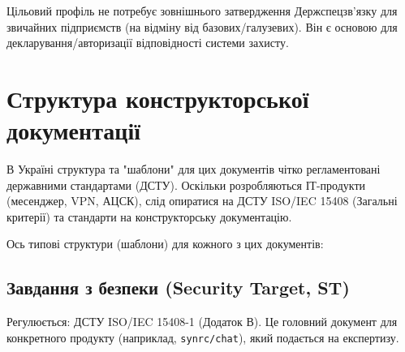 \documentclass{article}
\begin{document}
Цільовий профіль не потребує зовнішнього затвердження Держспецзв’язку для звичайних
підприємств (на відміну від базових/галузевих). Він є основою для декларування/авторизації відповідності системи захисту.

\section{Структура конструкторської документації}

В Україні структура та "шаблони" для цих документів чітко регламентовані державними
стандартами (ДСТУ). Оскільки розробляються ІТ-продукти (месенджер, VPN, АЦСК),
слід опиратися на ДСТУ ISO/IEC 15408 (Загальні критерії) та стандарти на конструкторську документацію.

Ось типові структури (шаблони) для кожного з цих документів:

\subsection{Завдання з безпеки (Security Target, ST)}

Регулюється: ДСТУ ISO/IEC 15408-1 (Додаток В).
Це головний документ для конкретного продукту (наприклад, \texttt{synrc/chat}), який подається на експертизу.
\end{document}
